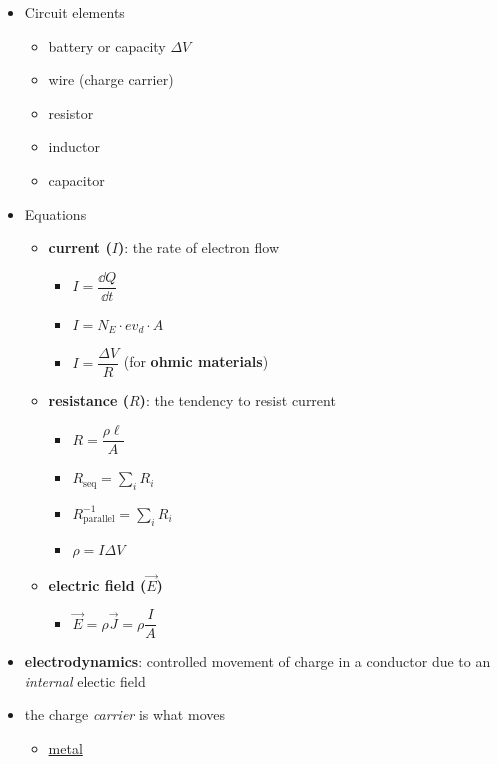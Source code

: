 \documentclass{article}
\begin{document}
    \begin{itemize}
      \item Circuit elements
        \begin{itemize}
          \item battery or capacity $\Delta V$
          \item wire (charge carrier)
          \item resistor
          \item inductor
          \item capacitor
        \end{itemize} 
      \item Equations
        \begin{itemize}
          \item \textbf{current ($I$)}: the rate of electron flow
            \begin{itemize}
              \item $I=\dfrac{\dd{Q}}{\dd{t}}$
              \item $I=N_E\cdot ev_d \cdot A$
              \item $I=\dfrac{\Delta V}{R}$ (for \textbf{ohmic materials})
            \end{itemize}
          \item \textbf{resistance ($R$)}: the tendency to resist current
            \begin{itemize}
              \item $R=\dfrac{\rho\ell}{A}$
              \item $R_{\mathrm{seq}}=\sum_i R_i$
              \item $R_{\mathrm{parallel}}^{-1}=\sum_i R_i$
              \item $\rho=I\Delta V$
            \end{itemize}
          \item \textbf{electric field ($\vec{E}$)}
            \begin{itemize}
              \item $\vec{E}=\rho\vec{J}=\rho\dfrac{I}{A}$
            \end{itemize} 
        \end{itemize}
      \item \textbf{electrodynamics}: controlled movement of charge in a conductor due to an \textit{internal} electic field
      \item the charge \textit{carrier} is what moves
        \begin{itemize}
          \item \underline{metal}

\end{itemize}
\end{itemize}
\end{document}
